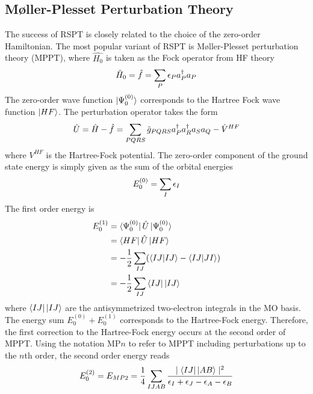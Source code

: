 \subsection{M{\o}ller-Plesset Perturbation Theory}

The success of RSPT is closely related to the choice of the zero-order Hamiltonian. The most popular variant of RSPT is M{\o}ller-Plesset perturbation theory (MPPT), where $\hat{H_0}$ is taken as the Fock operator from HF theory
\begin{equation}
\hat{H}_0 = \hat{f} = \sum_P \epsilon_P a^{\dagger}_P a_P
\end{equation}
\noindent The zero-order wave function $\ket{\smash{\Psi_0^{(0)}}}$ corresponds to the Hartree Fock wave function $\ket{\smash{HF}}$. The perturbation operator takes the form
\begin{equation}
\hat{U} = \hat{H} - \hat{f} = \sum_{PQRS} \hat{g}_{PQRS} a^{\dagger}_P a^{\dagger}_R a_S a_Q - \hat{V}^{HF} 
\end{equation}
\noindent where $V^{HF}$ is the Hartree-Fock potential. The zero-order component of the ground state energy is simply given as the sum of the orbital energies
\begin{equation}
E_0^{(0)} = \sum_I \epsilon_I
\end{equation}
\noindent The first order energy is
\begin{equation}
\begin{split}
E_0^{(1)} &= \sbra{\Psi_0^{(0)}} \hat{U} \sket{\Psi_0^{(0)}} \\
&= \sbra{HF}\hat{U}\sket{HF} \\
&= -\frac{1}{2} \sum_{IJ} ( \sbraket{IJ}{IJ} - \sbraket{IJ}{JI} ) \\
&= -\frac{1}{2} \sum_{IJ} \sbra{IJ}\sket{IJ} 
\end{split}
\end{equation}
\noindent where $\sbra{IJ}\sket{IJ}$ are the antisymmetrized two-electron integrals in the MO basis. The energy sum $E_0^{(0)} + E_0^{(1)}$ corresponds to the Hartree-Fock energy. Therefore, the first correction to the Hartree-Fock energy occurs at the second order of MPPT. Using the notation MP$n$ to refer to MPPT including perturbations up to the $n$th order, the second order energy reads
\begin{equation}
\begin{split}
E_0^{(2)} = E_{MP2} = \frac{1}{4} \sum_{IJAB} \frac{\mid \sbra{IJ}\sket{AB}\mid^2}{\eps_I + \eps_J - \eps_A - \eps_B}
\end{split} 
\label{eq:UMP2}
\end{equation}
